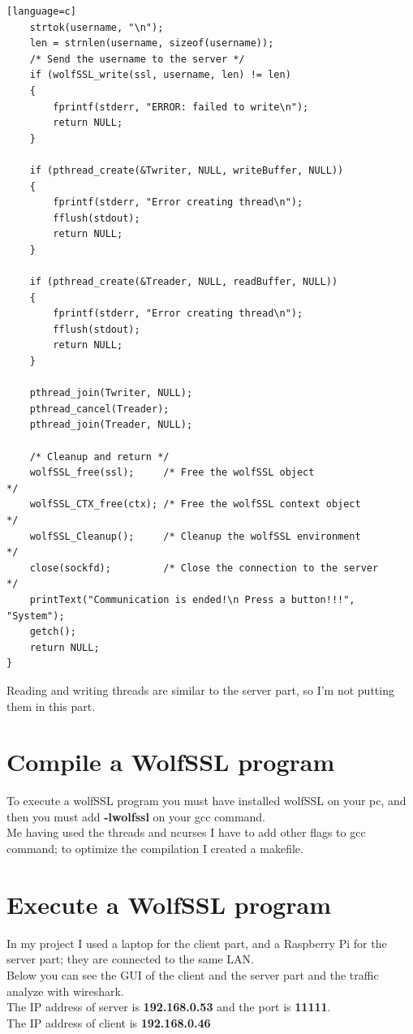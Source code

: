 \documentclass[a4paper,12pt]{report}
\begin{document}
\begin{lstlisting}[caption={void *client(void *args) of SSL client},captionpos=b][language=c]
    strtok(username, "\n");
    len = strnlen(username, sizeof(username));
    /* Send the username to the server */
    if (wolfSSL_write(ssl, username, len) != len)
    {
        fprintf(stderr, "ERROR: failed to write\n");
        return NULL;
    }

    if (pthread_create(&Twriter, NULL, writeBuffer, NULL))
    {
        fprintf(stderr, "Error creating thread\n");
        fflush(stdout);
        return NULL;
    }

    if (pthread_create(&Treader, NULL, readBuffer, NULL))
    {
        fprintf(stderr, "Error creating thread\n");
        fflush(stdout);
        return NULL;
    }

    pthread_join(Twriter, NULL);
    pthread_cancel(Treader);
    pthread_join(Treader, NULL);

    /* Cleanup and return */
    wolfSSL_free(ssl);     /* Free the wolfSSL object                  */
    wolfSSL_CTX_free(ctx); /* Free the wolfSSL context object          */
    wolfSSL_Cleanup();     /* Cleanup the wolfSSL environment          */
    close(sockfd);         /* Close the connection to the server       */
    printText("Communication is ended!\n Press a button!!!", "System");
    getch();
    return NULL;
}
\end{lstlisting}

Reading and writing threads are similar to the server part, so I'm not putting them in this part.

\section{Compile a WolfSSL program}
To execute a wolfSSL program you must have installed wolfSSL on your pc, and then you must add \textbf{-lwolfssl} on your gcc command.
\\Me having used the threads and ncurses I have to add other flags to gcc command; to optimize the compilation I created a makefile.

\section{Execute a WolfSSL program}
In my project I used a laptop for the client part, and a Raspberry Pi for the server part; they are connected to the same LAN.
\\Below you can see the GUI of the client and the server part and the traffic analyze with wireshark.
\\The IP address of server is \textbf{192.168.0.53} and the port is \textbf{11111}.
\\The IP address of client is \textbf{192.168.0.46}\\
\end{document}
